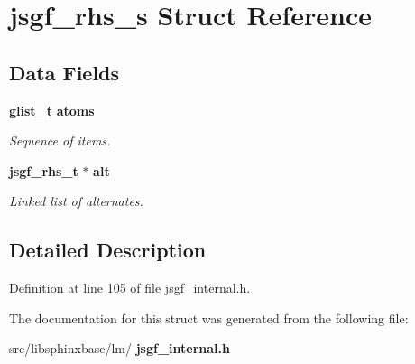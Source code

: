 \section{jsgf\+\_\+rhs\+\_\+s Struct Reference}
\label{structjsgf__rhs__s}
\subsection*{Data Fields}
\begin{DoxyCompactItemize}
\item 
\mbox{\label{structjsgf__rhs__s_a53c517a31c83eb357764fb891bba7008}} 
\textbf{ glist\+\_\+t} \textbf{ atoms}
\begin{DoxyCompactList}\small\item\em Sequence of items. \end{DoxyCompactList}\item 
\mbox{\label{structjsgf__rhs__s_ad07cf44d48798d86633b37e9e6e67ff5}} 
\textbf{ jsgf\+\_\+rhs\+\_\+t} $\ast$ \textbf{ alt}
\begin{DoxyCompactList}\small\item\em Linked list of alternates. \end{DoxyCompactList}\end{DoxyCompactItemize}


\subsection{Detailed Description}


Definition at line 105 of file jsgf\+\_\+internal.\+h.



The documentation for this struct was generated from the following file\+:\begin{DoxyCompactItemize}
\item 
src/libsphinxbase/lm/\textbf{ jsgf\+\_\+internal.\+h}\end{DoxyCompactItemize}
